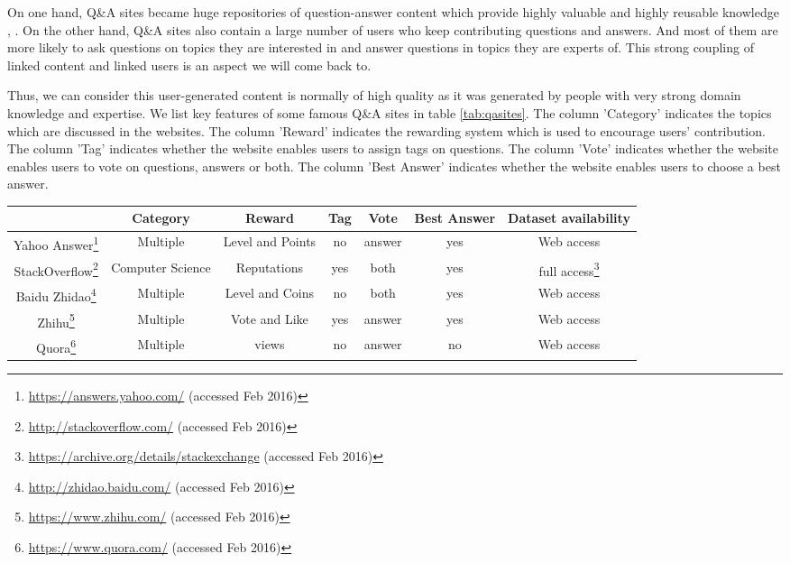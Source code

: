 On one hand, Q\&A sites became huge repositories of question-answer content which provide highly valuable and highly reusable knowledge \cite{anderson2012discovering}, \cite{Shah:2010:EPA:1835449.1835518}. On the other hand, Q\&A sites also contain a large number of users who keep contributing questions and answers. And most of them are more likely to ask questions on topics they are interested in and answer questions in topics they are experts of. This strong coupling of linked content and linked users is an aspect we will come back to.

Thus, we can consider this user-generated content is normally of high quality as it was generated by people with very strong domain knowledge and expertise. We list key features of some famous Q\&A sites in table \ref{tab:qasites}. 
The column 'Category' indicates the topics which are discussed in the websites.
The column 'Reward' indicates the rewarding system which is used to encourage users' contribution.
The column 'Tag' indicates whether the website enables users to assign tags on questions.
The column 'Vote' indicates whether the website enables users to vote on questions, answers or both.
The column 'Best Answer' indicates whether the website enables users to choose a best answer.



\begin{sidewaystable}%
\centering
\begin{tabular}{|c|c|c|c|c|c|c|}
\hline
& Category & Reward &  Tag & Vote & Best Answer & Dataset availability\\
\hline
Yahoo Answer\footnote{\url{https://answers.yahoo.com/} (accessed Feb 2016)} & Multiple & Level and Points & no& answer & yes & Web access\\
\hline
StackOverflow\footnote{\url{http://stackoverflow.com/} (accessed Feb 2016)} & Computer Science & Reputations & yes & both & yes& full access\footnote{\url{https://archive.org/details/stackexchange} (accessed Feb 2016)} \\
\hline
Baidu Zhidao\footnote{\url{http://zhidao.baidu.com/} (accessed Feb 2016)}& Multiple&Level and Coins & no &both & yes& Web access \\
\hline
Zhihu\footnote{\url{https://www.zhihu.com/} (accessed Feb 2016)} & Multiple & Vote and Like & yes & answer & yes& Web access \\
\hline
Quora\footnote{\url{https://www.quora.com/} (accessed Feb 2016)} & Multiple&views& no & answer & no & Web access\\
\hline
\end{tabular}
\caption{Key features of famous Q\&A sites}
\label{tab:qasites}
\end{sidewaystable}

